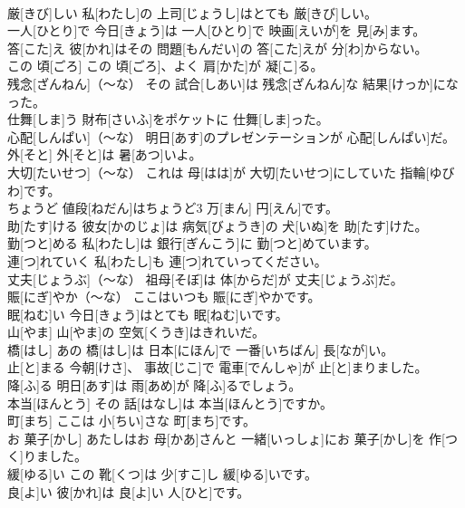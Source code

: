 \documentclass[8pt]{extreport}
\begin{document}
\begin{CJK}{UTF8}{min}
\\	厳[きび]しい	私[わたし]の 上司[じょうし]はとても 厳[きび]しい。		
\\	一人[ひとり]で	今日[きょう]は 一人[ひとり]で 映画[えいが]を 見[み]ます。		
\\	答[こた]え	彼[かれ]はその 問題[もんだい]の 答[こた]えが 分[わ]からない。		
\\	この 頃[ごろ]	この 頃[ごろ]、よく 肩[かた]が 凝[こ]る。		
\\	残念[ざんねん]（～な）	その 試合[しあい]は 残念[ざんねん]な 結果[けっか]になった。		
\\	仕舞[しま]う	財布[さいふ]をポケットに 仕舞[しま]った。		
\\	心配[しんぱい]（～な）	明日[あす]のプレゼンテーションが 心配[しんぱい]だ。		
\\	外[そと]	外[そと]は 暑[あつ]いよ。		
\\	大切[たいせつ]（～な）	これは 母[はは]が 大切[たいせつ]にしていた 指輪[ゆびわ]です。		
\\	ちょうど	値段[ねだん]はちょうど3 万[まん] 円[えん]です。		
\\	助[たす]ける	彼女[かのじょ]は 病気[びょうき]の 犬[いぬ]を 助[たす]けた。		
\\	勤[つと]める	私[わたし]は 銀行[ぎんこう]に 勤[つと]めています。		
\\	連[つ]れていく	私[わたし]も 連[つ]れていってください。		
\\	丈夫[じょうぶ]（～な）	祖母[そぼ]は 体[からだ]が 丈夫[じょうぶ]だ。		
\\	賑[にぎ]やか（～な）	ここはいつも 賑[にぎ]やかです。		
\\	眠[ねむ]い	今日[きょう]はとても 眠[ねむ]いです。		
\\	山[やま]	山[やま]の 空気[くうき]はきれいだ。		
\\	橋[はし]	あの 橋[はし]は 日本[にほん]で 一番[いちばん] 長[なが]い。		
\\	止[と]まる	今朝[けさ]、 事故[じこ]で 電車[でんしゃ]が 止[と]まりました。		
\\	降[ふ]る	明日[あす]は 雨[あめ]が 降[ふ]るでしょう。		
\\	本当[ほんとう]	その 話[はなし]は 本当[ほんとう]ですか。		
\\	町[まち]	ここは 小[ちい]さな 町[まち]です。		
\\	お 菓子[かし]	あたしはお 母[かあ]さんと 一緒[いっしょ]にお 菓子[かし]を 作[つく]りました。		
\\	緩[ゆる]い	この 靴[くつ]は 少[すこ]し 緩[ゆる]いです。		
\\	良[よ]い	彼[かれ]は 良[よ]い 人[ひと]です。		

\end{CJK}
\end{document}
